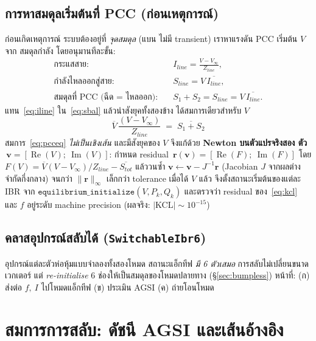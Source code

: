 \documentclass[12pt,a4paper]{article}
\newcommand{\re}{\operatorname{Re}}
\newcommand{\im}{\operatorname{Im}}
\begin{document}
\subsection{การหาสมดุลเริ่มต้นที่ PCC (ก่อนเหตุการณ์)}
\label{sec:equil}
ก่อนเกิดเหตุการณ์ ระบบต้องอยู่ที่ \emph{จุดสมดุล} (แบน ไม่มี transient) เราหาแรงดัน PCC เริ่มต้น $V$ จาก
สมดุลกำลัง โดยอนุมานทีละขั้น:
\begin{align}
\text{กระแสสาย:}\quad & I_{line} = \frac{V - V_\infty}{Z_{line}}, \label{eq:iline}\\
\text{กำลังไหลออกสู่สาย:}\quad & S_{line} = V\,\overline{I_{line}}, \label{eq:sline}\\
\text{สมดุลที่ PCC (ฉีด = ไหลออก):}\quad & S_1 + S_2 = S_{line} = V\,\overline{I_{line}}. \label{eq:sbal}
\end{align}
แทน~\eqref{eq:iline} ใน~\eqref{eq:sbal} แล้วนำสังยุคทั้งสองข้าง ได้สมการเดียวสำหรับ $V$
\begin{equation}
\boxed{\;\overline{V}\,\frac{(V - V_\infty)}{Z_{line}} \;=\; \overline{S_1 + S_2}\;}
\label{eq:pcceq}
\end{equation}
สมการ~\eqref{eq:pcceq} \emph{ไม่เป็นเชิงเส้น} และมีสังยุคของ $V$ จึงแก้ด้วย \textbf{Newton บนตัวแปรจริงสอง
ตัว} $\,\mathbf{v}=[\re(V);\ \im(V)]$: กำหนด residual $\,\mathbf{r}(\mathbf{v})=[\re(F);\ \im(F)]$ โดย
$F(V)=\overline{V}(V-V_\infty)/Z_{line}-\overline{S_{tot}}$ แล้ววนซ้ำ
$\mathbf{v}\leftarrow\mathbf{v}-J^{-1}\mathbf{r}$ (Jacobian $J$ จากผลต่างจำกัดกึ่งกลาง) จนกว่า
$\lVert\mathbf{r}\rVert_\infty$ เล็กกว่า tolerance เมื่อได้ $V$ แล้ว จึงตั้งสถานะเริ่มต้นของแต่ละ IBR จาก
$\texttt{equilibrium\_initialize}(V,P_k,Q_k)$ และตรวจว่า residual ของ~\eqref{eq:kcl} และ $f$ อยู่ระดับ
machine precision (ผลจริง: $\lvert$KCL$\rvert\sim10^{-15}$)

\subsection{คลาสอุปกรณ์สลับได้ (\texttt{SwitchableIbr6})}
อุปกรณ์แต่ละตัวห่อหุ้มแบบจำลองทั้งสองโหมด สถานะแอ็กทีฟ \emph{มี 6 ตัวเสมอ} การสลับไม่เปลี่ยนขนาดเวกเตอร์
แต่ \emph{re-initialise} 6 ช่องให้เป็นสมดุลของโหมดปลายทาง (\S\ref{sec:bumpless}) หน้าที่: (ก) ส่งต่อ
$f,\ I$ ไปโหมดแอ็กทีฟ (ข) ประเมิน AGSI (ค) ถ่ายโอนโหมด

\section{สมการการสลับ: ดัชนี AGSI และเส้นอ้างอิง}
\label{sec:agsi}
\end{document}
